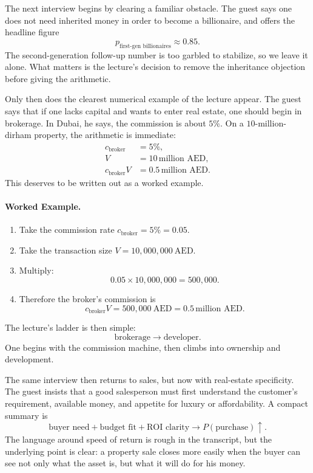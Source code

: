 The next interview begins by clearing a familiar obstacle. The guest says one does not need inherited money in order to become a billionaire, and offers the headline figure
\begin{equation}
p_{\text{first-gen billionaires}} \approx 0.85.
\end{equation}
The second-generation follow-up number is too garbled to stabilize, so we leave it alone. What matters is the lecture's decision to remove the inheritance objection before giving the arithmetic.

Only then does the clearest numerical example of the lecture appear. The guest says that if one lacks capital and wants to enter real estate, one should begin in brokerage. In Dubai, he says, the commission is about \(5\%\). On a \(10\)-million-dirham property, the arithmetic is immediate:
\begin{align}
c_{\text{broker}} &= 5\%, \\
V &= 10\,\text{million AED}, \\
c_{\text{broker}}V &= 0.5\,\text{million AED}.
\end{align}
This deserves to be written out as a worked example.

\paragraph{Worked Example.}
\begin{enumerate}
\item Take the commission rate \(c_{\text{broker}}=5\%=0.05\).
\item Take the transaction size \(V=10{,}000{,}000\ \text{AED}\).
\item Multiply:
\[
0.05 \times 10{,}000{,}000 = 500{,}000.
\]
\item Therefore the broker's commission is
\[
c_{\text{broker}}V = 500{,}000\ \text{AED} = 0.5\,\text{million AED}.
\]
\end{enumerate}
The lecture's ladder is then simple:
\begin{equation}
\text{brokerage} \to \text{developer}.
\end{equation}
One begins with the commission machine, then climbs into ownership and development.

The same interview then returns to sales, but now with real-estate specificity. The guest insists that a good salesperson must first understand the customer's requirement, available money, and appetite for luxury or affordability. A compact summary is
\begin{equation}
\text{buyer need} + \text{budget fit} + \text{ROI clarity}
\to
P(\text{purchase})\uparrow.
\end{equation}
The language around speed of return is rough in the transcript, but the underlying point is clear: a property sale closes more easily when the buyer can see not only what the asset is, but what it will do for his money.

